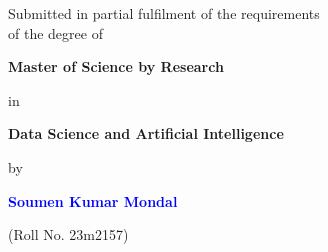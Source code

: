 
\thispagestyle{empty}
\singlespacing
\begin{titlepage}
\begin{center}
    \centering
     
      
  {{\Large \textbf{\ttitle}\par}}
     
    \vspace{1cm}
    {Submitted in partial fulfilment of the requirements\\of the degree of \par}
    \vspace{0.1cm}
    {
    \textbf{\large Master of Science by Research} \par}
    \vspace{0.1cm}
    {in \par}
    \vspace{0.1cm}
    {\textbf{Data Science and Artificial Intelligence} \par}
    \vspace{0.1cm}

		
    {by\par}
    \vspace{0.1cm}
    {\large \textbf{\textcolor{blue}{Soumen Kumar Mondal}}\par} 
    (Roll No. 23m2157)
    \vspace{0.1cm}
    

\end{center}
\end{titlepage}
